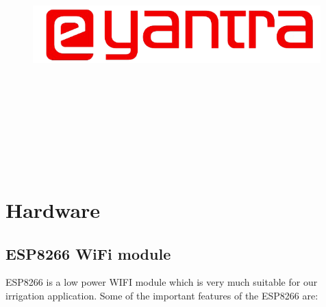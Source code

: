 \documentclass[16pt]{article}
\begin{document}
\begin{titlepage}
 
   

       \hfill\hfill\hfill
\begin{figure}
	 \begin{center}  
	\includegraphics[width=0.99\textwidth]{images/eyantralogo.png}
	 \end{center} 
\end{figure}

       
       \vspace{0.5cm}
        \\  
      
       
       \qquad{}\\ \\ \\ \\ \\ \\
        
       \qquad {}
         
  
          
\end{titlepage}
\tableofcontents
\vspace{15cm }

\section{Hardware}


\subsection{ESP8266 WiFi module}

\vspace{0.5cm}

ESP8266 is a low power WIFI module which is very much suitable for our
irrigation application. Some of the important features of the ESP8266
are:
\end{document}
